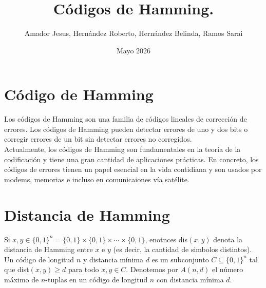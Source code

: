 

\title{C\'odigos de Hamming.}
\author{Amador Jesus, Hernández Roberto, Hernández Belinda, Ramos Sarai }
\date{Mayo 2026}




\maketitle

\section{C\'odigo de Hamming}
\noindent
  Los c\'odigos de Hamming son una familia de c\'odigos lineales de correcci\'on de 
  errores. Los c\'odigos de Hamming pueden detectar errores de uno y dos bits o corregir 
  errores de un bit sin detectar errores no corregidos.\\

\noindent
  Actualmente, los c\'odigos de Hamming son fundamentales en la teoria de la codificaci\'on y tiene una gran cantidad de aplicaciones pr\'acticas. En concreto, los c\'odigos de 
  errores tienen un papel esencial en la vida contidiana y son usados por modems, memorias e incluso en comunicaiones v\'ia sat\'elite.

\section{Distancia de Hamming}
\noindent
  Si $x,y \in \{0, 1\}^{n} = \{0, 1\}\times\{0, 1\}\times\cdots\times\{0, 1\}$, enotnces
  dis$(x,y)$ denota la distancia de Hamming entre $x$ e $y$ (es decir, la cantidad de 
  simbolos distintos). Un  c\'odigo de longitud $n$ y distancia m\'inima $d$ es un 
  subconjunto $C \subseteq \{0, 1\}^{n}$ tal que dist$(x,y) \geq d$ para todo $x,y \in C$.
  Denotemos por $A(n, d)$ el n\'umero m\'aximo de $n$-tuplas en un c\'odigo de longitud $n$ 
  con distancia m\'inima $d$.

\clearpage
%
%




